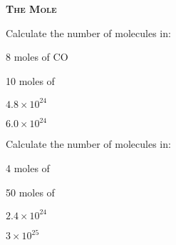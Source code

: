 \documentclass[main.tex]{subfiles}
\begin{document}
\newpage
\setdoublesep{0.35700 em}  %
\setatomsep{1.78500 em}    %
\setbondoffset{0.18265 em} %
\newcommand{\bondwidth}{0.06642 em} %
\setbondstyle{line width = \bondwidth}
\fancyhfoffset[E,O]{0pt}
\setlength{\columnsep}{30pt}
\begin{conclusion}
\end{conclusion}
\begin{multicols*}{2}\setcounter{numA}{1}


{\raggedright\textsc{\textbf{The Mole }}\par}

\begin{question}[ID=\the\value{numA}]
Calculate the number of molecules in:
\begin{inparaenum}[(a)]	
\item  8 moles of CO
\item	10 moles of 
\end{inparaenum} 
\end{question}
\begin{solution}
\begin{inparaenum}[(a)]	
\item  $4.8\times 10^{24}$
\item  $6.0\times 10^{24}$
\end{inparaenum} 
\hspace{0.1cm}\end{solution}%
\begin{question}[ID=\the\value{numA}]
Calculate the number of molecules in:
\begin{inparaenum}[(a)]	
\item  4 moles of 
\item	50 moles of 
\end{inparaenum} 
\end{question}
\begin{solution}
\begin{inparaenum}[(a)]	
\item  $2.4\times 10^{24}$
\item  $3\times 10^{25}$
\end{inparaenum} 
\hspace{0.1cm}\end{solution}%


\end{multicols*}
\end{document}
